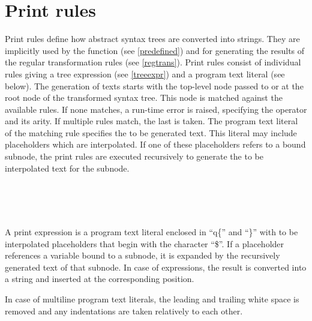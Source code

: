 \chapter{Print rules}\label{print}

Print rules define how abstract syntax trees are converted into
strings. They are implicitly used by the  function
(see \ref{predefined}) and for generating the results of the regular
transformation rules (see \ref{regtrans}). Print rules consist of
individual rules giving a tree expression (see \ref{treeexpr}) and a
program text literal (see below). The generation of texts starts with
the top-level node passed to  or at the root node of
the transformed syntax tree. This node is matched
against the available rules. If none matches, a run-time error is
raised, specifying the operator and its arity. If multiple rules
match, the last is taken. The program text literal of the matching
rule specifies the to be generated text. This literal may include
placeholders which are interpolated. If one of these placeholders refers
to a bound subnode, the print rules are executed recursively to generate
the to be interpolated text for the subnode.

\begin{grammar}
      \produces {} 
	 \lextoken{\{} 
	 \lextoken{\}} \\
      \produces {} \\
      \produces {}
	  \\
      \produces {}
	 \lextoken{->}  \lextoken{;}
\end{grammar}

\noindent
A print expression is a program text literal enclosed in ``q\{'' and
``\}'' with to be interpolated placeholders that begin with the character
``\$''.  If a placeholder references a variable bound to a subnode, it
is expanded by the recursively generated text of that subnode.  In case
of expressions, the result is converted into a string and inserted at
the corresponding position.

In case of multiline program text literals, the leading and trailing
white space is removed and any indentations are taken relatively to
each other.

